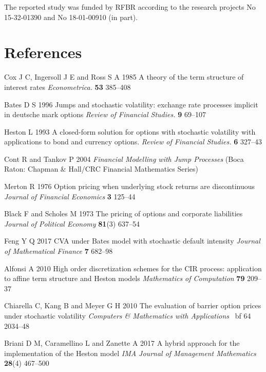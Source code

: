 \documentclass[a4paper]{jpconf}
\begin{document}
The reported study was funded by RFBR according to the research projects No 15-32-01390 and No 18-01-00910 (in part).


\section*{References}
\medskip
\begin{thebibliography}{18}

 Cox J C, Ingersoll J E and Ross S A 1985 A theory of the term structure of interest rates  {\it Econometrica.} {\bf 53} 385--408

 Bates D S 1996 Jumps and stochastic volatility: exchange rate processes implicit in deutsche mark options {\it Review of Financial Studies.}  {\bf 9} 69--107

 Heston L 1993 A closed-form solution for options with stochastic volatility with applications to bond and currency options. {\it Review of Financial Studies.} {\bf 6} 327--43

 Cont R and Tankov P 2004 {\it Financial Modelling with Jump Processes} (Boca Raton: Chapman \& Hall/CRC Financial Mathematics Series)

 Merton R 1976 Option pricing when underlying stock returns are discontinuous {\it Journal of Financial Economics} {\bf 3} 125--44

 Black F and Scholes M 1973 The pricing of options and corporate liabilities {\it Journal of Political Economy} {\bf 81}(3) 637--54

 Feng Y Q 2017 CVA under Bates model with stochastic default intensity {\it Journal of Mathematical Finance} {\bf 7} 682--98

 Alfonsi A 2010 High order discretization schemes for the CIR process: application to affine term structure and Heston models {\it Mathematics of Computation} {\bf 79} 209--37

 Chiarella C, Kang B and Meyer G H 2010 The evaluation of barrier option prices under stochastic volatility {\it Computers \& Mathematics with Applications} {\ bf 64} 2034--48

 Briani D M, Caramellino L and Zanette A 2017 A hybrid approach for the implementation of the Heston model {\it IMA Journal of Management Mathematics} {\bf 28}(4) 467--500


\end{thebibliography}
\end{document}
